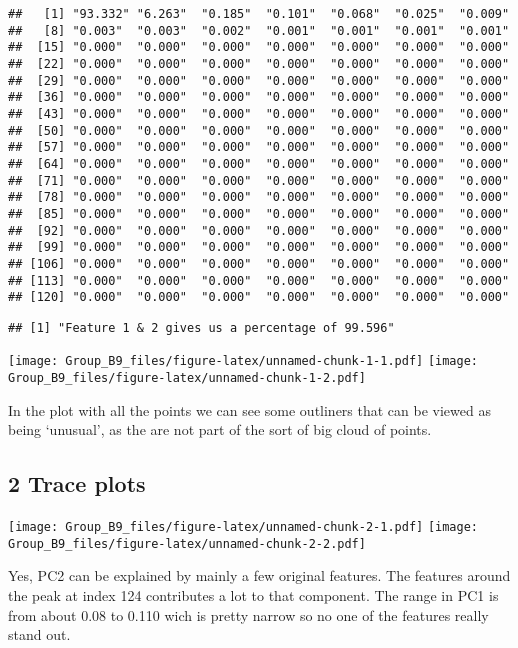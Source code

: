 \documentclass[]{article}
\begin{document}
\begin{verbatim}
##   [1] "93.332" "6.263"  "0.185"  "0.101"  "0.068"  "0.025"  "0.009" 
##   [8] "0.003"  "0.003"  "0.002"  "0.001"  "0.001"  "0.001"  "0.001" 
##  [15] "0.000"  "0.000"  "0.000"  "0.000"  "0.000"  "0.000"  "0.000" 
##  [22] "0.000"  "0.000"  "0.000"  "0.000"  "0.000"  "0.000"  "0.000" 
##  [29] "0.000"  "0.000"  "0.000"  "0.000"  "0.000"  "0.000"  "0.000" 
##  [36] "0.000"  "0.000"  "0.000"  "0.000"  "0.000"  "0.000"  "0.000" 
##  [43] "0.000"  "0.000"  "0.000"  "0.000"  "0.000"  "0.000"  "0.000" 
##  [50] "0.000"  "0.000"  "0.000"  "0.000"  "0.000"  "0.000"  "0.000" 
##  [57] "0.000"  "0.000"  "0.000"  "0.000"  "0.000"  "0.000"  "0.000" 
##  [64] "0.000"  "0.000"  "0.000"  "0.000"  "0.000"  "0.000"  "0.000" 
##  [71] "0.000"  "0.000"  "0.000"  "0.000"  "0.000"  "0.000"  "0.000" 
##  [78] "0.000"  "0.000"  "0.000"  "0.000"  "0.000"  "0.000"  "0.000" 
##  [85] "0.000"  "0.000"  "0.000"  "0.000"  "0.000"  "0.000"  "0.000" 
##  [92] "0.000"  "0.000"  "0.000"  "0.000"  "0.000"  "0.000"  "0.000" 
##  [99] "0.000"  "0.000"  "0.000"  "0.000"  "0.000"  "0.000"  "0.000" 
## [106] "0.000"  "0.000"  "0.000"  "0.000"  "0.000"  "0.000"  "0.000" 
## [113] "0.000"  "0.000"  "0.000"  "0.000"  "0.000"  "0.000"  "0.000" 
## [120] "0.000"  "0.000"  "0.000"  "0.000"  "0.000"  "0.000"  "0.000"
\end{verbatim}

\begin{verbatim}
## [1] "Feature 1 & 2 gives us a percentage of 99.596"
\end{verbatim}

\texttt{[image: Group\_B9\_files/figure-latex/unnamed-chunk-1-1.pdf]}
\texttt{[image: Group\_B9\_files/figure-latex/unnamed-chunk-1-2.pdf]}

In the plot with all the points we can see some outliners that can be
viewed as being `unusual', as the are not part of the sort of big cloud
of points.

\subsection{2 Trace plots}\label{trace-plots}

\texttt{[image: Group\_B9\_files/figure-latex/unnamed-chunk-2-1.pdf]}
\texttt{[image: Group\_B9\_files/figure-latex/unnamed-chunk-2-2.pdf]}

Yes, PC2 can be explained by mainly a few original features. The
features around the peak at index 124 contributes a lot to that
component. The range in PC1 is from about 0.08 to 0.110 wich is pretty
narrow so no one of the features really stand out.
\end{document}
